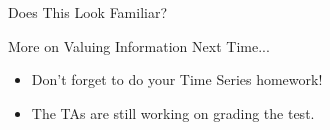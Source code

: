\documentclass{beamer}\usepackage[]{graphicx}\usepackage[]{color}
\begin{document}
\begin{darkframes}
    \begin{frame}[fragile]{Does This Look Familiar?}
    \fontsize{10}{10}\selectfont  
  

    \end{frame}


    \begin{frame}{More on Valuing Information Next Time...}
      \fontsize{10}{10}\selectfont

      \begin{itemize}
        \item Don't forget to do your Time Series homework!
        \item The TAs are still working on grading the test.
      \end{itemize}
      
    \end{frame}

  \end{darkframes}
\end{document}
